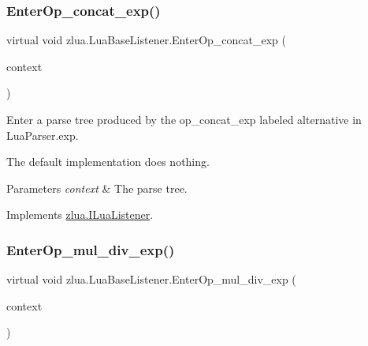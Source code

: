 \subsubsection{\texorpdfstring{Enter\+Op\+\_\+concat\+\_\+exp()}{EnterOp\_concat\_exp()}}
{\footnotesize\ttfamily virtual void zlua.\+Lua\+Base\+Listener.\+Enter\+Op\+\_\+concat\+\_\+exp (\begin{DoxyParamCaption}\item[{\mbox{[}\+Not\+Null\mbox{]} \mbox{\hyperlink{classzlua_1_1_lua_parser_1_1_op__concat__exp_context}{Lua\+Parser.\+Op\+\_\+concat\+\_\+exp\+Context}}}]{context }\end{DoxyParamCaption})\hspace{0.3cm}{\ttfamily [virtual]}}



Enter a parse tree produced by the {\ttfamily op\+\_\+concat\+\_\+exp} labeled alternative in Lua\+Parser.\+exp. 

The default implementation does nothing.


\begin{DoxyParams}{Parameters}
{\em context} & The parse tree.\\
\hline
\end{DoxyParams}


Implements \mbox{\hyperlink{interfacezlua_1_1_i_lua_listener_acbbb173b8111f78841067f364c764c2c}{zlua.\+I\+Lua\+Listener}}.

\mbox{\label{classzlua_1_1_lua_base_listener_a6c6043921201d7aad886fc07f059c3e8}} 
\subsubsection{\texorpdfstring{Enter\+Op\+\_\+mul\+\_\+div\+\_\+exp()}{EnterOp\_mul\_div\_exp()}}
{\footnotesize\ttfamily virtual void zlua.\+Lua\+Base\+Listener.\+Enter\+Op\+\_\+mul\+\_\+div\+\_\+exp (\begin{DoxyParamCaption}\item[{\mbox{[}\+Not\+Null\mbox{]} \mbox{\hyperlink{classzlua_1_1_lua_parser_1_1_op__mul__div__exp_context}{Lua\+Parser.\+Op\+\_\+mul\+\_\+div\+\_\+exp\+Context}}}]{context }\end{DoxyParamCaption})\hspace{0.3cm}{\ttfamily [virtual]}}



